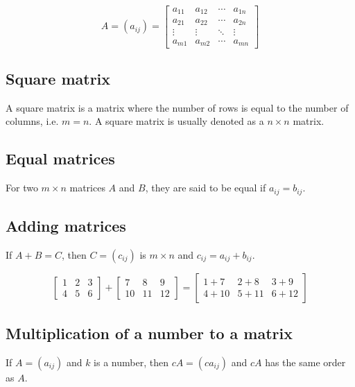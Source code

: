 \documentclass[11pt]{article}
\begin{document}
\begin{displaymath}
A = (a_{ij}) = \begin{bmatrix}
a_{11} & a_{12} & \cdots & a_{1n} \\
a_{21} & a_{22} & \cdots & a_{2n} \\
\vdots & \vdots & \ddots & \vdots \\
a_{m1} & a_{m2} & \cdots & a_{mn}
\end{bmatrix}
\end{displaymath}

\subsection{Square matrix}
\label{sec:orgd44b1fd}
A square matrix is a matrix where the number of rows is equal to the number of columns, i.e. \(m = n\). A square matrix is usually denoted as a \(n \times n\) matrix.

\subsection{Equal matrices}
\label{sec:org1e5dc18}
For two \(m \times n\) matrices \(A\) and \(B\), they are said to be equal if \(a_{ij} = b_{ij}\).

\subsection{Adding matrices}
\label{sec:org08ac771}
If \(A + B = C\), then \(C = (c_{ij})\) is \(m \times n\) and \(c_{ij} = a_{ij} + b_{ij}\).

\begin{displaymath}
\begin{bmatrix}
1 & 2 & 3 \\
4 & 5 & 6
\end{bmatrix} + \begin{bmatrix}
7 & 8 & 9 \\
10 & 11 & 12
\end{bmatrix} = \begin{bmatrix}
1 + 7 & 2 + 8 & 3 + 9 \\
4 + 10 & 5 + 11 & 6 + 12
\end{bmatrix}
\end{displaymath}

\subsection{Multiplication of a number to a matrix}
\label{sec:org313a4cb}
If \(A = (a_{ij})\) and \(k\) is a number, then \(cA = (ca_{ij})\) and \(cA\) has the same order as \(A\).
\end{document}
